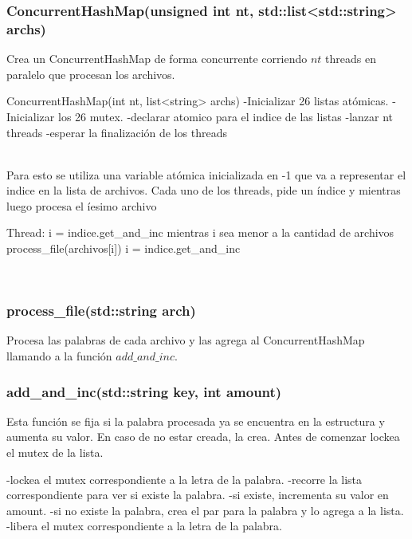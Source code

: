 \subsubsection{ConcurrentHashMap(unsigned int nt, std::list<std::string> archs)}
Crea un ConcurrentHashMap de forma concurrente corriendo $nt$ threads en paralelo que procesan los archivos.\\
\begin{codesnippet}
 ConcurrentHashMap(int nt, list<string> archs)
 	-Inicializar 26 listas atómicas.
 	-Inicializar los 26 mutex.
 	-declarar atomico para el indice de las listas
 	-lanzar nt threads
 	-esperar la finalización de los threads
\end{codesnippet}\\
Para esto se utiliza una variable atómica inicializada en -1 que va a representar el indice en la lista de archivos.
Cada uno de los threads, pide un índice y mientras luego procesa el íesimo archivo\\
\begin{codesnippet}
 	Thread:
 		i = indice.get_and_inc
 		mientras i sea menor a la cantidad de archivos
 			process_file(archivos[i])
 			i = indice.get_and_inc
\end{codesnippet}\\

\subsubsection{process_file(std::string arch)}
Procesa las palabras de cada archivo y las agrega al ConcurrentHashMap llamando a la función $add\_and\_inc$.

\subsubsection{add_and_inc(std::string key, int amount)}
Esta función se fija si la palabra procesada ya se encuentra en la estructura y aumenta su valor. En caso de no estar creada, la crea. Antes de comenzar lockea el mutex de la lista.\\
\begin{codesnippet}
 	-lockea el mutex correspondiente a la letra de la palabra.
 	-recorre la lista correspondiente para ver si existe la palabra.
 	-si existe, incrementa su valor en amount.
 	-si no existe la palabra, crea el par para la palabra y lo agrega a la lista.
 	-libera el mutex correspondiente a la letra de la palabra.
\end{codesnippet}\\

